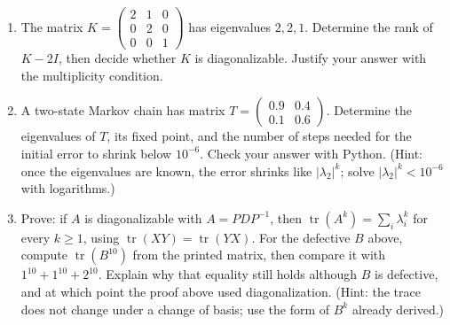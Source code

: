 \begin{latihan}
\begin{enumerate}
  \item The matrix $K=\begin{pmatrix}2&1&0\\ 0&2&0\\ 0&0&1\end{pmatrix}$ has eigenvalues $2,2,1$.
        Determine the rank of $K-2I$, then decide whether $K$ is diagonalizable. Justify your
        answer with the multiplicity condition.

  \item A two-state Markov chain has matrix
        $T=\begin{pmatrix}0.9&0.4\\ 0.1&0.6\end{pmatrix}$. Determine the eigenvalues of $T$, its
        fixed point, and the number of steps needed for the initial error to shrink below
        $10^{-6}$. Check your answer with Python.
        (Hint: once the eigenvalues are known, the error shrinks like $|\lambda_{2}|^{k}$; solve
        $|\lambda_{2}|^{k}<10^{-6}$ with logarithms.)

  \item Prove: if $A$ is diagonalizable with $A=PDP^{-1}$, then
        $\operatorname{tr}(A^{k})=\sum_{i}\lambda_{i}^{k}$ for every $k\ge1$, using
        $\operatorname{tr}(XY)=\operatorname{tr}(YX)$. For the defective $B$ above, compute
        $\operatorname{tr}(B^{10})$ from the printed matrix, then compare it with
        $1^{10}+1^{10}+2^{10}$. Explain why that equality still holds although $B$ is defective,
        and at which point the proof above used diagonalization.
        (Hint: the trace does not change under a change of basis; use the form of $B^{k}$ already
        derived.)
\end{enumerate}
\end{latihan}

